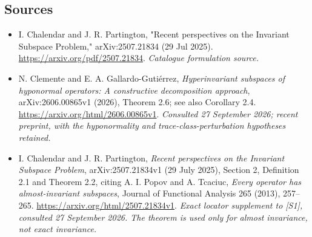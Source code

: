 \documentclass[11pt,a4paper]{article}
\numberwithin{equation}{section}
\begin{document}
\subsection{Sources}
\begin{itemize}\raggedright
\item[\textnormal{[S1]}]\hypertarget{source:3034:1}{} I. Chalendar and J. R. Partington, "Recent perspectives on the Invariant Subspace Problem," arXiv:2507.21834 (29 Jul 2025).
\url{https://arxiv.org/pdf/2507.21834}.
{\small\textit{Catalogue formulation source.}}
\item[\textnormal{[E1]}]\hypertarget{extra:3034:1}{} N. Clemente and
E. A. Gallardo-Guti\'errez, \emph{Hyperinvariant subspaces of hyponormal
operators: A constructive decomposition approach}, arXiv:2606.00865v1
(2026), Theorem 2.6; see also Corollary 2.4.
\url{https://arxiv.org/html/2606.00865v1}.
{\small\textit{Consulted 27 September 2026; recent preprint, with the hyponormality and trace-class-perturbation hypotheses retained.}}
\item[\textnormal{[E2]}]\hypertarget{extra:3034:2}{} I. Chalendar and
J. R. Partington, \emph{Recent perspectives on the Invariant Subspace
Problem}, arXiv:2507.21834v1 (29 July 2025), Section 2,
Definition 2.1 and Theorem 2.2, citing A. I. Popov and A. Tcaciuc,
\emph{Every operator has almost-invariant subspaces},
Journal of Functional Analysis 265 (2013), 257--265.
\url{https://arxiv.org/html/2507.21834v1}.
{\small\textit{Exact locator supplement to [S1], consulted 27 September 2026. The theorem is used only for almost invariance, not exact invariance.}}
\end{itemize}
\end{document}
